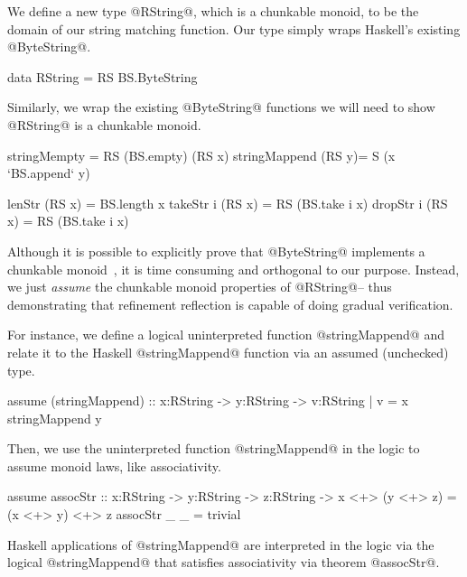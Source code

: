 We define a new type @RString@, which is a chunkable monoid, to be the
domain of our string matching function. Our type simply wraps
Haskell's existing @ByteString@.
\begin{code}
  data RString = RS BS.ByteString
\end{code}
Similarly, we wrap the existing @ByteString@ functions we will need to
show @RString@ is a chunkable monoid.
\begin{code}
  stringMempty = RS (BS.empty)
  (RS x) stringMappend (RS y)= S (x `BS.append` y)

  lenStr    (RS x) = BS.length x
  takeStr i (RS x) = RS (BS.take i x)
  dropStr i (RS x) = RS (BS.take i x)
\end{code}
Although it is possible to explicitly prove that @ByteString@
implements a chunkable monoid~\cite{realworldliquid14}, it is time
consuming and orthogonal to our purpose. Instead, we
just \textit{assume} the chunkable monoid properties of @RString@--
thus demonstrating that refinement reflection is capable of doing
gradual verification.



For instance, we define a logical uninterpreted function
@stringMappend@ and relate it to the Haskell @stringMappend@ function
via an assumed (unchecked) type.
%
\begin{code}
  assume (stringMappend) :: x:RString -> y:RString -> {v:RString | v = x stringMappend y}
\end{code}
%
Then, we use the uninterpreted function @stringMappend@ in the logic
to assume monoid laws, like associativity.
%
\begin{code}
  assume assocStr 
    :: x:RString -> y:RString -> z:RString 
    -> {x <+> (y <+> z) = (x <+> y) <+> z}
  assocStr _ _     = trivial
\end{code}
%
Haskell applications of @stringMappend@ are interpreted in the logic
via the logical @stringMappend@ that satisfies associativity via theorem @assocStr@.

